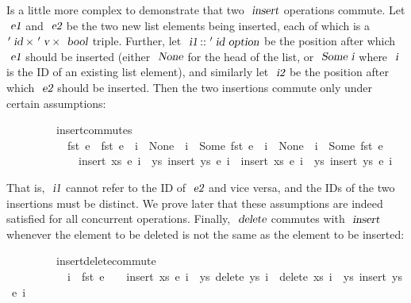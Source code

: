 Is a little more complex to demonstrate that two $\isa{insert}$ operations commute.
Let $\isa{e1}$ and $\isa{e2}$ be the two new list elements being inserted, each of which is a $\isacharprime\isa{id} \mathbin{\isasymtimes} \isacharprime\isa{v} \mathbin{\isasymtimes} \isa{bool}$ triple.
Further, let $\isa{i1} \mathbin{\isacharcolon\isacharcolon} \isacharprime\isa{id option}$ be the position after which $\isa{e1}$ should be inserted (either $\isa{None}$ for the head of the list, or $\isa{Some i}$ where $\isa{i}$ is the ID of an existing list element), and similarly let $\isa{i2}$ be the position after which $\isa{e2}$ should be inserted.
Then the two insertions commute only under certain assumptions:
\vspace{0.275em}
\begin{isabellebody}
\ \ \ \ \ \ \ \ \ insert{\isacharunderscore}commutes{\isacharcolon}\isanewline
\ \ \ \ \ \ \ \ \ \ \ {\isachardoublequoteopen}fst\ e{}\ {\isasymnoteq}\ fst\ e{}{\isachardoublequoteclose}\ \ {\isachardoublequoteopen}i{}\ {\isacharequal}\ None\ {\isasymor}\ i{}\ {\isasymnoteq}\ Some\ {\isacharparenleft}fst\ e{}{\isacharparenright}{\isachardoublequoteclose}\ \ {\isachardoublequoteopen}i{}\ {\isacharequal}\ None\ {\isasymor}\ i{}\ {\isasymnoteq}\ Some\ {\isacharparenleft}fst\ e{}{\isacharparenright}{\isachardoublequoteclose}\isanewline
\ \ \ \ \ \ \ \ \ \ \ \ \ {\isachardoublequoteopen}insert\ xs\ e{}\ i{}\ {\isasymbind}\ {\isacharparenleft}{\isasymlambda}ys{\isachardot}\ insert\ ys\ e{}\ i{}{\isacharparenright}\ {\isacharequal}\ insert\ xs\ e{}\ i{}\ {\isasymbind}\ {\isacharparenleft}{\isasymlambda}ys{\isachardot}\ insert\ ys\ e{}\ i{}{\isacharparenright}{\isachardoublequoteclose}
\end{isabellebody}
\vspace{0.275em}
\noindent
That is, $\isa{i1}$ cannot refer to the ID of $\isa{e2}$ and vice versa, and the IDs of the two insertions must be distinct.
We prove later that these assumptions are indeed satisfied for all concurrent operations.
Finally, $\isa{delete}$ commutes with $\isa{insert}$ whenever the element to be deleted is not the same as the element to be inserted:
\vspace{0.275em}
\begin{isabellebody}
\ \ \ \ \ \ \ \ \ insert{\isacharunderscore}delete{\isacharunderscore}commute{\isacharcolon}\isanewline
\ \ \ \ \ \ \ \ \ \ \ {\isachardoublequoteopen}i{}\ {\isasymnoteq}\ fst\ e{\isachardoublequoteclose}\ \ \ \ {\isachardoublequoteopen}insert\ xs\ e\ i{}\ {\isasymbind}\ {\isacharparenleft}{\isasymlambda}ys{\isachardot}\ delete\ ys\ i{}{\isacharparenright}\ {\isacharequal}\ delete\ xs\ i{}\ {\isasymbind}\ {\isacharparenleft}{\isasymlambda}ys{\isachardot}\ insert\ ys\ e\ i{}{\isacharparenright}{\isachardoublequoteclose}
\end{isabellebody}

